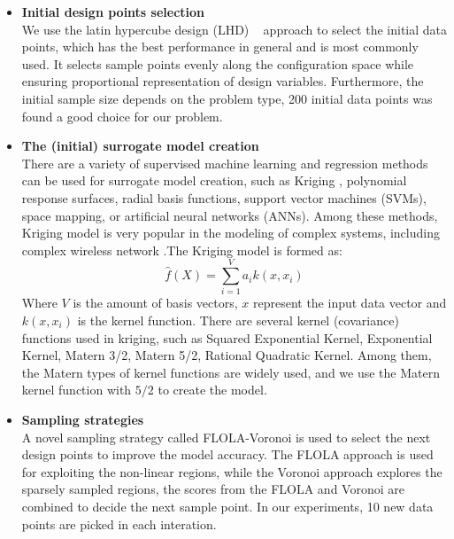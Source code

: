 \begin{itemize}
\item \textbf{Initial design points selection}  \\
 We use the latin hypercube design (LHD) ~\cite{FAViana2013} approach to select the initial data points, which has the best performance in general and is  most commonly used. It selects sample points evenly along the configuration space while ensuring proportional representation of design variables. Furthermore, the initial sample size depends on the problem type, 200 initial data points was found a good choice for our problem.
 
\item \textbf{The (initial) surrogate model creation}  \\
There are a variety of supervised machine learning and regression methods can be used for surrogate model creation, such as Kriging \cite{forrester2008engineering}, polynomial response surfaces, radial basis functions, support vector machines (SVMs),  space mapping, or artificial neural networks (ANNs). Among these methods, Kriging model is 
very popular in the modeling of  complex systems, including complex wireless network \cite{SUMOWirelessConferencing,wowmom2018, LTEoptimization}.The Kriging model is formed as:
\begin{equation}
\hat{f} (X) = \sum_{i=1}^{V} {a_i}{k(x, x_i)}
\end{equation}
Where $V$ is the amount of basis vectors, $x$ represent the input data vector and $k(x, x_i)$ is the kernel function. There are several kernel (covariance) functions used in kriging, such as Squared Exponential Kernel, Exponential Kernel, Matern 3/2, Matern 5/2, Rational Quadratic Kernel. Among them, the Matern types of kernel functions are  widely used, and we use the Matern kernel function with %
$5/2$ to create the model. 

\item \textbf{Sampling strategies} \\
A novel sampling strategy called FLOLA-Voronoi \cite{vanderherten2015} is used to select the next design points to improve the model accuracy.  The FLOLA approach is used for exploiting the non-linear regions, while the Voronoi approach explores the sparsely sampled regions, the scores from  the FLOLA and Voronoi are combined to decide the next sample point. In our experiments, 10 new data points are picked in each interation.

 



\end{itemize}
